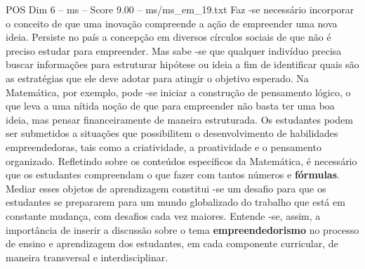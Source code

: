 \begin{textsample}{POS Dim 6 – ms – Score 9.00 – ms/ms\_em\_19.txt}
Faz -se necessário incorporar o conceito de que uma inovação compreende a ação de empreender uma nova ideia.
Persiste no país a concepção em diversos círculos sociais de que não é preciso estudar para empreender.
Mas sabe -se que qualquer indivíduo precisa buscar informações para estruturar hipótese ou ideia a fim de identificar quais são as estratégias que ele deve adotar para atingir o objetivo esperado.
Na Matemática, por exemplo, pode -se iniciar a construção de pensamento lógico, o que leva a uma nítida noção de que para empreender não basta ter uma boa ideia, mas pensar financeiramente de maneira estruturada.
Os estudantes podem ser submetidos a situações que possibilitem o desenvolvimento de habilidades empreendedoras, tais como a criatividade, a proatividade e o pensamento organizado.
Refletindo sobre os conteúdos específicos da Matemática, é necessário que os estudantes compreendam o que fazer com tantos números e \textbf{fórmulas}.
Mediar esses objetos de aprendizagem constitui -se um desafio para que os estudantes se prepararem para um mundo globalizado do trabalho que está em constante mudança, com desafios cada vez maiores.
Entende -se, assim, a importância de inserir a discussão sobre o tema \textbf{empreendedorismo} no processo de ensino e aprendizagem dos estudantes, em cada componente curricular, de maneira transversal e interdisciplinar.

\end{textsample}
